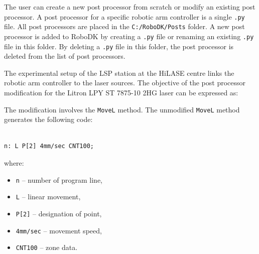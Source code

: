 The user can create a new post processor from scratch or modify an existing post processor. A post processor for a specific robotic arm controller is a single \texttt{.py} file. All post processors are placed in the \texttt{C:/RoboDK/Posts} folder. A new post processor is added to RoboDK by creating a \texttt{.py} file or renaming an existing \texttt{.py} file in this folder. By deleting a \texttt{.py} file in this folder, the post processor is deleted from the list of post processors. 

The experimental setup of the LSP station at the HiLASE centre links the robotic arm controller to the laser sources. The objective of the post processor modification for the Litron LPY ST 7875-10 2HG laser can be expressed as:



The modification involves the \texttt{MoveL} method. The unmodified \texttt{MoveL} method generates the following code:


\begin{verbatim}

n: L P[2] 4mm/sec CNT100;

\end{verbatim}


where:

\begin{itemize}

    \item \texttt{n} -- number of program line, 
    \item \texttt{L} -- linear movement,
    \item \texttt{P[2]} -- designation of point,
    \item \texttt{4mm/sec} -- movement speed,
    \item \texttt{CNT100} -- zone data.

\end{itemize}

